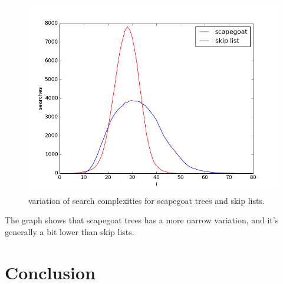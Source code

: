 \documentclass[12pt, a4paper]{article}
\begin{document}
\begin{figure}[H]
    \centering
    \includegraphics[width=1\textwidth]{variation.png}
    \caption{variation of search complexities for scapegoat trees and skip lists.}
    \label{variation}
\end{figure}

The graph shows that scapegoat trees has a more narrow variation, and it's generally a bit lower than skip lists.




\section*{Conclusion}
\end{document}
